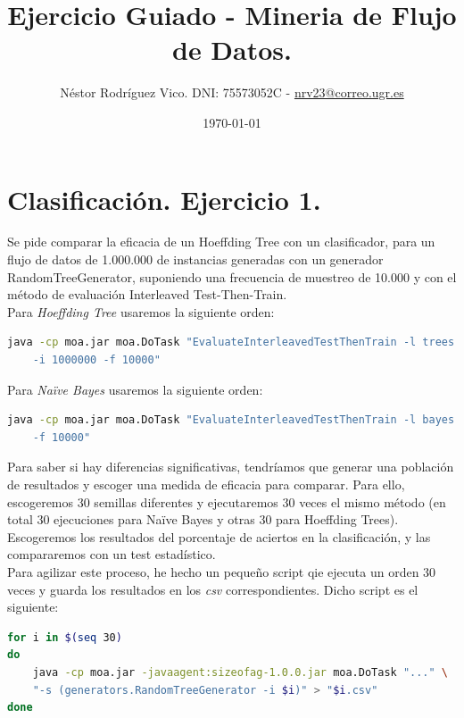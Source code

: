 \documentclass[11pt]{article}
\title{Ejercicio Guiado - Mineria de Flujo de Datos.}
\author{Néstor Rodríguez Vico. DNI: 75573052C - \href{mailto:nrv23@correo.ugr.es}{nrv23@correo.ugr.es}}
\date{\today}
\begin{document}
\maketitle

\setlength{\belowdisplayskip}{5pt} 
\setlength{\belowdisplayshortskip}{5pt}
\setlength{\abovedisplayskip}{5pt} 
\setlength{\abovedisplayshortskip}{5pt}

\section{Clasificación. Ejercicio 1.}

Se pide comparar la eficacia de un Hoeffding Tree con un clasificador, para un flujo de datos de 1.000.000 de instancias generadas con un generador RandomTreeGenerator, suponiendo una frecuencia de muestreo de 10.000 y con el método de evaluación Interleaved Test-Then-Train. \\

Para \textit{Hoeffding Tree} usaremos la siguiente orden:

\begin{lstlisting}[language=bash]
java -cp moa.jar moa.DoTask "EvaluateInterleavedTestThenTrain -l trees.HoeffdingTree \
	-i 1000000 -f 10000"
\end{lstlisting}

Para \textit{Na\"{i}ve Bayes} usaremos la siguiente orden:

\begin{lstlisting}[language=bash]
java -cp moa.jar moa.DoTask "EvaluateInterleavedTestThenTrain -l bayes.NaiveBayes -i 1000000 \
	-f 10000"
\end{lstlisting}

Para saber si hay diferencias significativas, tendríamos que generar una población de resultados y escoger una medida de eficacia para comparar. Para ello, escogeremos 30 semillas diferentes y ejecutaremos 30 veces el mismo método (en total 30 ejecuciones para Na\"{i}ve Bayes y otras 30 para Hoeffding Trees). Escogeremos los resultados del porcentaje de aciertos en la clasificación, y las compararemos con un test estadístico. \\

Para agilizar este proceso, he hecho un pequeño script qie ejecuta un orden 30 veces y guarda los resultados en los \textit{csv} correspondientes. Dicho script es el siguiente:

\begin{lstlisting}[language=bash]
for i in $(seq 30)
do
	java -cp moa.jar -javaagent:sizeofag-1.0.0.jar moa.DoTask "..." \
	"-s (generators.RandomTreeGenerator -i $i)" > "$i.csv"
done
\end{lstlisting}
\end{document}
